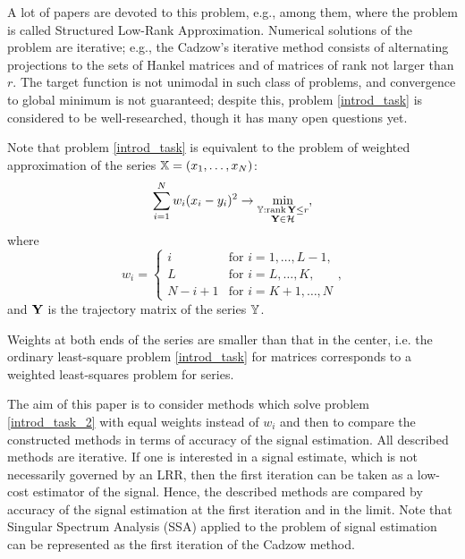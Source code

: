 \documentclass[sii]{ipart}
\def\rank{\mathop{\mathrm{rank}}}
\begin{document}
A lot of papers are devoted to this problem, e.g., \cite{Cadzow1988, Markovsky2011, Usevich.Markovsky2014, Gillard.Zhigljavsky2013} among them, where the problem is called Structured Low-Rank Approximation. Numerical solutions of the problem are iterative; e.g., the Cadzow's iterative method \cite{Cadzow1988} consists of alternating projections to the sets of Hankel matrices and of matrices of rank not larger than $r$. The target function is not unimodal in such class of problems, and convergence to global minimum is not guaranteed; despite this, problem \eqref{introd_task} is considered to be well-researched, though it has many open questions yet.

Note that problem \eqref{introd_task} is equivalent to the problem of weighted approximation of the series $\mathbb{X} = (x_1, \ldots, x_N)$:
\begin{equation}\label{introd_task_2}
\sum_{i = 1}^N w_i(x_i - y_i)^2 \to \min_{\substack{\tsY: \rank \bfY \le r \\ \bfY \in \calH}},
\end{equation}
where
\begin{equation}
\label{eq:w}
w_i = \begin{cases}
i & \text{for $i = 1, \ldots, L-1,$}\\
L & \text{for $i = L, \ldots, K,$}\\
N - i + 1 & \text{for $i = K + 1, \ldots, N$}
\end{cases},
\end{equation}
and $\mathbf{Y}$ is the  trajectory matrix of the series $\mathbb{Y}$.

Weights at both ends of the series are smaller than that in the center, i.e. the ordinary least-square problem \eqref{introd_task} for matrices corresponds to a weighted least-squares problem for series.

The aim of this paper is to consider methods which solve problem \eqref{introd_task_2} with equal weights instead of $w_i$ and then to compare the constructed methods in terms of accuracy of the signal estimation. All described methods are iterative.
If one is interested in a signal estimate, which is not necessarily governed by an LRR, then the first iteration can be taken as a low-cost estimator of the signal.
Hence, the described methods are compared by accuracy of the signal estimation at the first iteration and in the limit. Note that Singular Spectrum Analysis (SSA) \cite{Broomhead.King1986, Vautard.etal1992, Elsner.Tsonis1996, Golyandina.etal2001, Ghil.etal2002, Golyandina.Zhigljavsky2012} applied to the problem of signal estimation can be represented as the first iteration of the Cadzow method.
\end{document}
